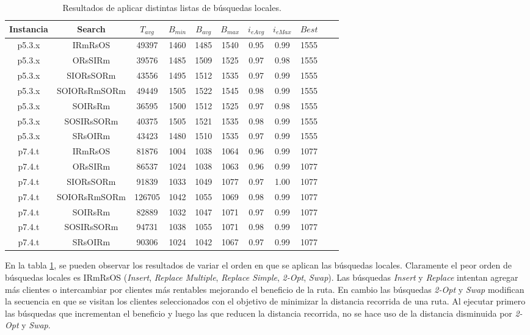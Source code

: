 \bigskip

\begin{table}
\begin{center}
\begin{tabular}{ |c|c|c|c|c|c|c|c|c|c|c| } 
\hline
Instancia & Search & $T_{avg}$ & $B_{min}$ & $B_{avg}$ & $B_{max}$ & $i_{eAvg}$ & $i_{eMax}$ & $Best$ \\
\hline
p5.3.x & IRmRsOS & 49397 & 1460 & 1485 & 1540 & 0.95 & 0.99 & 1555  \\
p5.3.x & ORsSIRm & 39576 & 1485 & 1509 & 1525 & 0.97 & 0.98 & 1555  \\
p5.3.x & SIORsSORm & 43556 & 1495 & 1512 & 1535 & 0.97 & 0.99 & 1555  \\
p5.3.x & SOIORsRmSORm & 49449 & 1505 & 1522 & 1545 & 0.98 & 0.99 & 1555  \\
p5.3.x & SOIRsRm & 36595 & 1500 & 1512 & 1525 & 0.97 & 0.98 & 1555  \\
p5.3.x & SOSIRsSORm & 40375 & 1505 & 1521 & 1535 & 0.98 & 0.99 & 1555  \\
p5.3.x & SRsOIRm & 43423 & 1480 & 1510 & 1535 & 0.97 & 0.99 & 1555  \\
p7.4.t & IRmRsOS & 81876 & 1004 & 1038 & 1064 & 0.96 & 0.99 & 1077  \\
p7.4.t & ORsSIRm & 86537 & 1024 & 1038 & 1063 & 0.96 & 0.99 & 1077  \\
p7.4.t & SIORsSORm & 91839 & 1033 & 1049 & 1077 & 0.97 & 1.00 & 1077  \\
p7.4.t & SOIORsRmSORm & 126705 & 1042 & 1055 & 1069 & 0.98 & 0.99 & 1077  \\
p7.4.t & SOIRsRm & 82889 & 1032 & 1047 & 1071 & 0.97 & 0.99 & 1077  \\
p7.4.t & SOSIRsSORm & 94731 & 1038 & 1055 & 1071 & 0.98 & 0.99 & 1077  \\
p7.4.t & SRsOIRm & 90306 & 1024 & 1042 & 1067 & 0.97 & 0.99 & 1077  \\
\hline
\end{tabular}
\end{center}
\caption{Resultados de aplicar distintas listas de búsquedas locales.}
\label{tab:resultadosListaLS}
\end{table}

\bigskip

En la tabla \ref{tab:resultadosListaLS}, se pueden observar los resultados de variar el orden en que se aplican las búsquedas locales. Claramente el peor orden de búsquedas locales es IRmRsOS (\textit{Insert}, \textit{Replace Multiple}, \textit{Replace Simple}, \textit{2-Opt}, \textit{Swap}). Las búsquedas \textit{Insert} y \textit{Replace} intentan agregar más clientes o intercambiar por clientes más rentables mejorando el beneficio de la ruta. En cambio las búsquedas \textit{2-Opt} y \textit{Swap} modifican la secuencia en que se visitan los clientes seleccionados con el objetivo de minimizar la distancia recorrida de una ruta. Al ejecutar primero las búsquedas que incrementan el beneficio y luego las que reducen la distancia recorrida, no se hace uso de la distancia disminuida por \textit{2-Opt} y \textit{Swap}.

